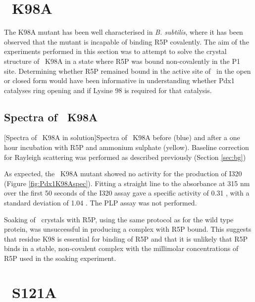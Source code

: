 \section{\atpdx ~K98A}
The K98A mutant has been well characterised in \textit{B. subtilis}, where it has been observed that the mutant is incapable of binding R5P covalently. The aim of the experiments performed in this section was to attempt to solve the crystal structure of \atpdx ~K98A in a state where R5P was bound non-covalently in the P1 site. Determining whether R5P remained bound in the active site of \atpdx ~in the open or closed form would have been informative in understanding whether Pdx1 catalyses ring opening and if Lysine 98 is required for that catalysis.  

\subsection*{Spectra of \atpdx ~K98A}\label{sec:K98A}


\begin{minipage}{\linewidth}

	[Spectra of \atpdx ~K98A in solution]{Spectra of \atpdx ~K98A before (blue) and after a one hour incubation with R5P and ammonium sulphate (yellow). Baseline correction for Rayleigh scattering was performed as described previously (Section \ref{sec:bg})\label{fig:Pdx1K98Aspec}}	
\end{minipage} 

As expected, the \atpdx ~K98A mutant showed no activity for the production of I320 (Figure \ref{fig:Pdx1K98Aspec}). Fitting a straight line to the absorbance at 315 nm over the first 50 seconds of the I320 assay gave a specific activity of 0.31 \act, with a standard deviation of 1.04 \act. The PLP assay was not performed. 

Soaking of \atpdx ~crystals with R5P, using the same protocol as for the wild type protein, was unsuccessful in producing a complex with R5P bound. This suggests that residue K98 is essential for binding of R5P and that it is unlikely that R5P binds in a stable, non-covalent complex with the millimolar concentrations of R5P used in the soaking experiment.  
\clearpage
\section{\atpdx ~S121A}
\FloatBarrier
